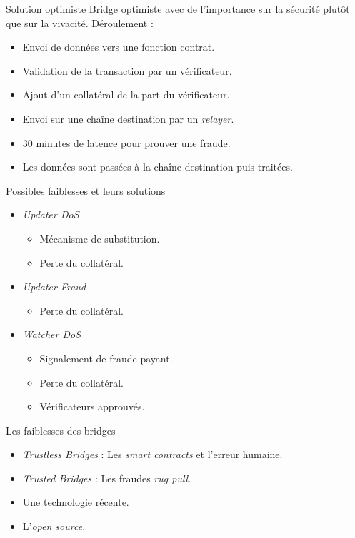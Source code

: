 \begin{frame}{Solution optimiste}
Bridge optimiste avec de l'importance sur la sécurité plutôt que sur la vivacité.
Déroulement : \newline
\begin{itemize}
    \item Envoi de données vers une fonction contrat.
    \item Validation de la transaction par un vérificateur. 
    \item Ajout d'un collatéral de la part du vérificateur. 
    \item Envoi sur une chaîne destination par un \textit{relayer}. 
    \item 30 minutes de latence pour prouver une fraude.
    \item Les données sont passées à la chaîne destination puis traitées.
\end{itemize}
\end{frame}

\begin{frame}{Possibles faiblesses et leurs solutions}
\begin{itemize}
    \item \textit{Updater DoS}
        \begin{itemize}
            \item Mécanisme de substitution.
            \item Perte du collatéral.
        \end{itemize}
    \item \textit{Updater Fraud} \begin{itemize} \item Perte du collatéral. \end{itemize}
    \item \textit{Watcher DoS} 
        \begin{itemize}
            \item Signalement de fraude payant.
            \item Perte du collatéral.
            \item Vérificateurs approuvés.
        \end{itemize}
\end{itemize}
\end{frame}

\begin{frame}{Les faiblesses des bridges}
\begin{itemize}
    \item \textit{Trustless Bridges} : Les \textit{smart contracts} et l'erreur humaine.
    \item \textit{Trusted Bridges} : Les fraudes \textit{rug pull}.
    \item Une technologie récente.
    \item L'\textit{open source}.
\end{itemize}
\end{frame}
